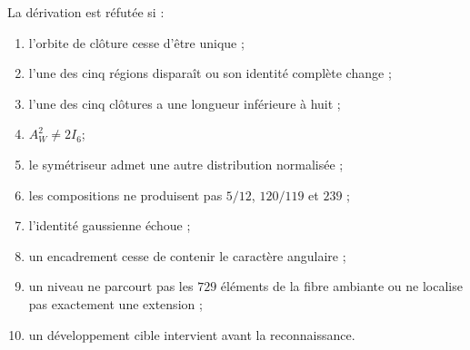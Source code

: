 \begin{criterion}
La dérivation est réfutée si :
\begin{enumerate}
 \item l’orbite de clôture cesse d’être unique ;
 \item l’une des cinq régions disparaît ou son identité complète change ;
 \item l’une des cinq clôtures a une longueur inférieure à huit ;
 \item \(A_W^2\ne2I_6\);
 \item le symétriseur admet une autre distribution normalisée ;
 \item les compositions ne produisent pas \(5/12\), \(120/119\) et \(239\) ;
 \item l’identité gaussienne échoue ;
 \item un encadrement cesse de contenir le caractère angulaire ;
 \item un niveau ne parcourt pas les \(729\) éléments de la fibre ambiante ou ne
       localise pas exactement une extension ;
 \item un développement cible intervient avant la reconnaissance.
\end{enumerate}
\end{criterion}
